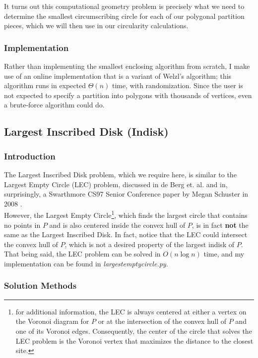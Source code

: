 \documentclass[11pt]{article}
\begin{document}
It turns out this computational geometry problem is precisely what we need to determine the smallest circumscribing circle for each of our polygonal partition pieces, which we will then use in our circularity calculations.

\subsubsection{Implementation}
Rather than implementing the smallest enclosing algorithm from scratch, I make use of an online implementation \cite{nayuki} that is a variant of Welzl's algorithm; this algorithm runs in expected $\Theta(n)$ time, with randomization. 
Since the user is not expected to specify a partition into polygons with thousands of vertices, even a brute-force algorithm could do.

\subsection{Largest Inscribed Disk (Indisk)}

\subsubsection{Introduction}
The Largest Inscribed Disk problem, which we require here, is similar to the Largest Empty Circle (LEC) problem, discussed in de Berg et. al. and in, 
surprisingly, a Swarthmore CS97 Senior Conference paper by Megan Schuster in 2008 \cite{schuster}. \\

However, the Largest Empty Circle\footnote{\noindent for additional information, the LEC is always centered at
either a vertex on the Voronoi diagram for $P$ or at the intersection of the convex hull of $P$ and one of its Voronoi edges. 
Consequently, the center of the circle that solves the LEC problem is the Voronoi vertex that maximizes the distance to the closest site.}, which finds the largest circle that contains no points in $P$ and is also centered inside the convex hull of $P$, is in fact \textbf{not}
the same as the Largest Inscribed Disk. In fact, notice that the LEC could intersect the convex hull of $P$, which is not a desired property of the largest indisk of $P$.
That being said, the LEC problem can be solved in $O(n \log n)$ time, and my implementation can be found in \textit{largestemptycircle.py}. 
\subsubsection{Solution Methods}
\end{document}
